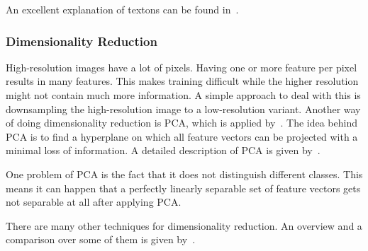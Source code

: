 An excellent explanation of textons can be found in~\cite{zhu2005textons}.


\subsubsection{Dimensionality Reduction}
High-resolution images have a lot of pixels. Having one or more feature per
pixel results in many features. This makes training difficult while the higher
resolution might not contain much more information. A simple approach to deal
with this is downsampling the high-resolution image to a low-resolution
variant. Another way of doing dimensionality reduction is \gls{PCA}, which is
applied by~\cite{chen2011pixel}. The idea behind \gls{PCA} is to find a
hyperplane on which all feature vectors can be projected with a minimal loss of
information. A detailed description of \gls{PCA} is given
by~\cite{smith2002tutorial}.

One problem of \gls{PCA} is the fact that it does not distinguish different
classes. This means it can happen that a perfectly linearly separable set of
feature vectors gets not separable at all after applying \gls{PCA}.

There are many other techniques for dimensionality reduction. An overview and
a comparison over some of them is given by~\cite{van2009dimensionality}.
